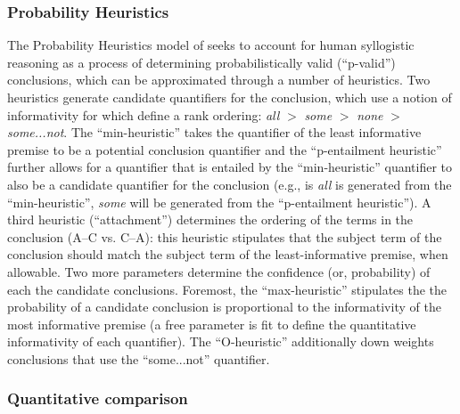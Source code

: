 \documentclass[floatsintext, doc]{apa6}
\begin{document}
\subsubsection{Probability Heuristics} 

The Probability Heuristics model of  seeks to account for human syllogistic reasoning as a process of determining probabilistically valid (``p-valid'') conclusions, which can be approximated through a number of heuristics. 
Two heuristics generate candidate quantifiers for the conclusion, which use a notion of informativity for which  define a rank ordering: \emph{all} $>$ \emph{some} $>$ \emph{none} $>$ \emph{some...not}.  
The ``min-heuristic'' takes the quantifier of the least informative premise to be a potential conclusion quantifier and the ``p-entailment heuristic'' further allows for a quantifier that is entailed by the ``min-heuristic'' quantifier to also be a candidate quantifier for the conclusion (e.g., is \emph{all} is generated from the ``min-heuristic'', \emph{some} will be generated from the ``p-entailment heuristic''). 
A third heuristic (``attachment'') determines the ordering of the terms in the conclusion (A--C vs. C--A): this heuristic stipulates that the subject term of the conclusion should match the subject term of the least-informative premise, when allowable. 
Two more parameters determine the confidence (or, probability) of each the candidate conclusions. 
Foremost, the ``max-heuristic'' stipulates the the probability of a candidate conclusion is proportional to the informativity of the most informative premise (a free parameter is fit to define the quantitative informativity of each quantifier). 
The ``O-heuristic'' additionally down weights conclusions that use the ``some...not'' quantifier.

\subsubsection{Quantitative comparison}
\end{document}
